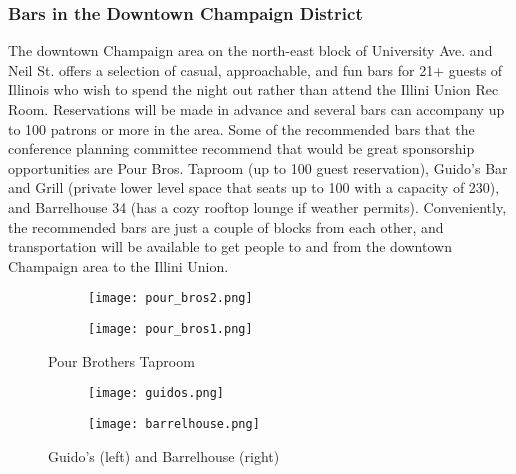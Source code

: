 \subsubsection{Bars in the Downtown Champaign District} 
The downtown Champaign area on the north-east block of University Ave. and Neil St. offers a selection of casual, approachable, and fun bars for 21+ guests of Illinois who wish to spend the night out rather than attend the Illini Union Rec Room. Reservations will be made in advance and several bars can accompany up to 100 patrons or more in the area. Some of the recommended bars that the conference planning committee recommend that would be great sponsorship opportunities are Pour Bros. Taproom (up to 100 guest reservation), Guido's Bar and Grill (private lower level space that seats up to 100 with a capacity of 230), and Barrelhouse 34 (has a cozy rooftop lounge if weather permits). Conveniently, the recommended bars are just a couple of blocks from each other, and transportation will be available to get people to and from the downtown Champaign area to the Illini Union.
\vspace{0.5cm}\newline
\begin{figure}[H]
	\centering
	\begin{subfigure}{0.5\textwidth}
		\centering
		\texttt{[image: pour\_bros2.png]}
	\end{subfigure}%
	\begin{subfigure}{0.5\textwidth}
		\centering
		\texttt{[image: pour\_bros1.png]}
	\end{subfigure}	
	\caption{Pour Brothers Taproom}	
\end{figure}

\begin{figure}[H]
	\centering
	\begin{subfigure}{0.5\textwidth}
		\centering
		\texttt{[image: guidos.png]}
	\end{subfigure}%
	\begin{subfigure}{0.5\textwidth}
		\centering
		\texttt{[image: barrelhouse.png]}
	\end{subfigure}	
	\caption{Guido's (left) and Barrelhouse (right)}	
\end{figure}


